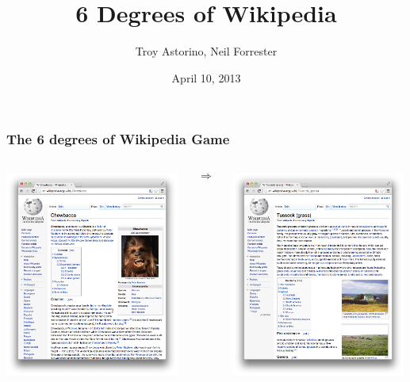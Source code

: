 \documentclass{beamer}
\title{6 Degrees of Wikipedia}
\author{Troy Astorino, Neil Forrester}
\date{April 10, 2013}
\institute[6.834 -- MIT]{Cognitive Robotics \\ Massachusetts Institute of Technology}
\begin{document}
\begin{frame}
  \maketitle
\end{frame}

\begin{frame}
  \frametitle{The 6 degrees of Wikipedia Game}

\begin{columns}
\begin{column}{0.45\textwidth}
  \includegraphics[width=2.25in]{img/chewbacca.png}
\end{column}

\begin{column}{0.1\textwidth}
$$ \Longrightarrow $$
\end{column}

\begin{column}{0.45\textwidth}
  \includegraphics[width=2.25in]{img/tussock.png}
\end{column}

\end{columns}

\end{frame}
\end{document}
